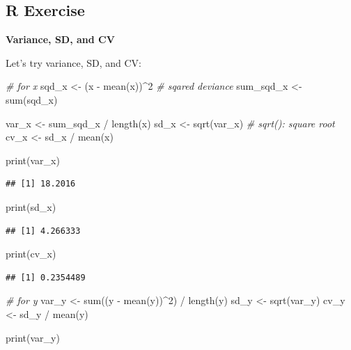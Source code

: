 \documentclass[
]{book}
\newenvironment{Shaded}{\begin{snugshade}}{\end{snugshade}}
\newcommand{\CommentTok}[1]{\textcolor[rgb]{0.56,0.35,0.01}{\textit{#1}}}
\newcommand{\DecValTok}[1]{\textcolor[rgb]{0.00,0.00,0.81}{#1}}
\newcommand{\FunctionTok}[1]{\textcolor[rgb]{0.00,0.00,0.00}{#1}}
\newcommand{\NormalTok}[1]{#1}
\newcommand{\OtherTok}[1]{\textcolor[rgb]{0.56,0.35,0.01}{#1}}
\newcommand{\SpecialCharTok}[1]{\textcolor[rgb]{0.00,0.00,0.00}{#1}}
\begin{document}
\hypertarget{r-exercise-1}{%
\subsection{R Exercise}\label{r-exercise-1}}

\textbf{Variance, SD, and CV}

Let's try variance, SD, and CV:

\begin{Shaded}
\begin{Highlighting}[]
\CommentTok{\# for x}
\NormalTok{sqd\_x }\OtherTok{\textless{}{-}}\NormalTok{ (x }\SpecialCharTok{{-}} \FunctionTok{mean}\NormalTok{(x))}\SpecialCharTok{\^{}}\DecValTok{2} \CommentTok{\# sqared deviance}
\NormalTok{sum\_sqd\_x }\OtherTok{\textless{}{-}} \FunctionTok{sum}\NormalTok{(sqd\_x)}

\NormalTok{var\_x }\OtherTok{\textless{}{-}}\NormalTok{ sum\_sqd\_x }\SpecialCharTok{/} \FunctionTok{length}\NormalTok{(x)}
\NormalTok{sd\_x }\OtherTok{\textless{}{-}} \FunctionTok{sqrt}\NormalTok{(var\_x) }\CommentTok{\# sqrt(): square root}
\NormalTok{cv\_x }\OtherTok{\textless{}{-}}\NormalTok{ sd\_x }\SpecialCharTok{/} \FunctionTok{mean}\NormalTok{(x)}

\FunctionTok{print}\NormalTok{(var\_x)}
\end{Highlighting}
\end{Shaded}

\begin{verbatim}
## [1] 18.2016
\end{verbatim}

\begin{Shaded}
\begin{Highlighting}[]
\FunctionTok{print}\NormalTok{(sd\_x)}
\end{Highlighting}
\end{Shaded}

\begin{verbatim}
## [1] 4.266333
\end{verbatim}

\begin{Shaded}
\begin{Highlighting}[]
\FunctionTok{print}\NormalTok{(cv\_x)}
\end{Highlighting}
\end{Shaded}

\begin{verbatim}
## [1] 0.2354489
\end{verbatim}

\begin{Shaded}
\begin{Highlighting}[]
\CommentTok{\# for y}
\NormalTok{var\_y }\OtherTok{\textless{}{-}} \FunctionTok{sum}\NormalTok{((y }\SpecialCharTok{{-}} \FunctionTok{mean}\NormalTok{(y))}\SpecialCharTok{\^{}}\DecValTok{2}\NormalTok{) }\SpecialCharTok{/} \FunctionTok{length}\NormalTok{(y)}
\NormalTok{sd\_y }\OtherTok{\textless{}{-}} \FunctionTok{sqrt}\NormalTok{(var\_y)}
\NormalTok{cv\_y }\OtherTok{\textless{}{-}}\NormalTok{ sd\_y }\SpecialCharTok{/} \FunctionTok{mean}\NormalTok{(y)}

\FunctionTok{print}\NormalTok{(var\_y)}
\end{Highlighting}
\end{Shaded}
\end{document}
